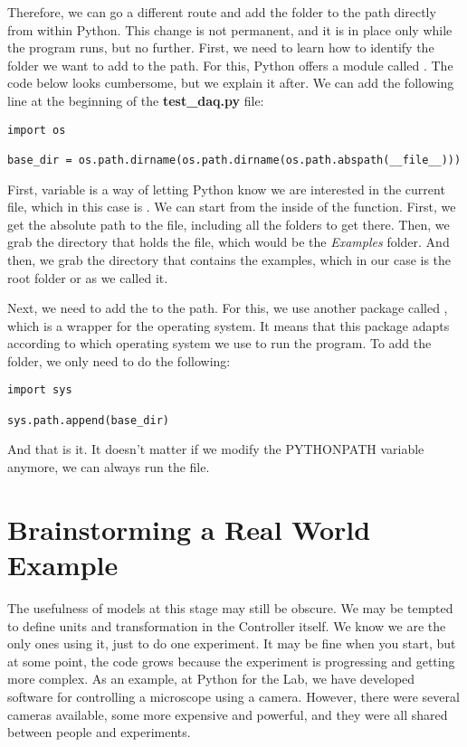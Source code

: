 Therefore, we can go a different route and add the folder to the path directly from within Python. This change is not permanent, and it is in place only while the program runs, but no further. First, we need to learn how to identify the folder we want to add to the path. For this, Python offers a module called . The code below looks cumbersome, but we explain it after. We can add the following line at the beginning of the \textbf{test\_daq.py} file:

\begin{verbatim}
import os

base_dir = os.path.dirname(os.path.dirname(os.path.abspath(__file__)))
\end{verbatim}

First,  variable is a way of letting Python know we are interested in the current file, which in this case is . We can start from the inside of the function. First, we get the absolute path to the file, including all the folders to get there. Then, we grab the directory that holds the file, which would be the \emph{Examples} folder. And then, we grab the directory that contains the examples, which in our case is the root folder or  as we called it.

Next, we need to add the  to the path. For this, we use another package called , which is a wrapper for the operating system. It means that this package adapts according to which operating system we use to run the program. To add the folder, we only need to do the following:

\begin{verbatim}
import sys

sys.path.append(base_dir)
\end{verbatim}

And that is it. It doesn't matter if we modify the PYTHONPATH variable anymore, we can always run the  file.


\section{Brainstorming a Real World Example}\label{sec:real-world-model}
The usefulness of models at this stage may still be obscure. We may be tempted to define units and transformation in the Controller itself. We know we are the only ones using it, just to do one experiment. It may be fine when you start, but at some point, the code grows because the experiment is progressing and getting more complex. As an example, at Python for the Lab, we have developed software for controlling a microscope using a camera. However, there were several cameras available, some more expensive and powerful, and they were all shared between people and experiments.

